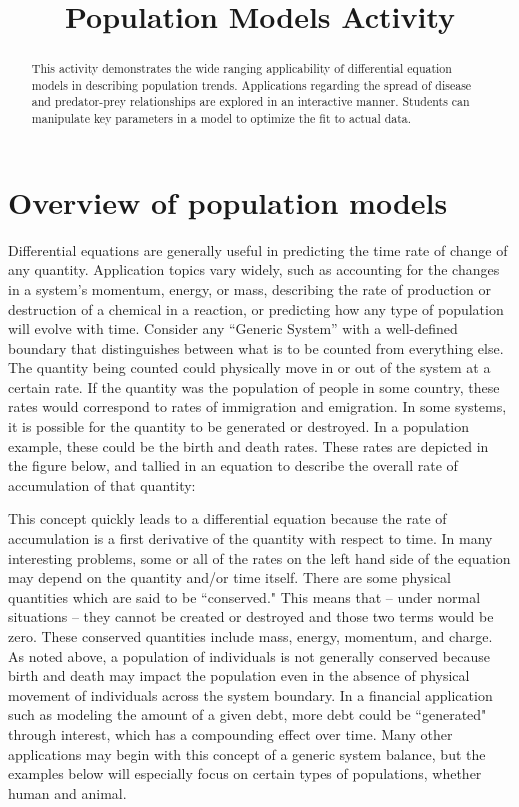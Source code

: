 \documentclass{ximera}
\title{Population Models Activity}
\begin{document}
   
\begin{abstract}
This activity demonstrates the wide ranging applicability of differential equation models in describing population trends.  Applications regarding the spread of disease and predator-prey relationships are explored in an interactive manner.  Students can manipulate key parameters in a model to optimize the fit to actual data.    
\end{abstract}
   
\maketitle
   
\section*{Overview of population models}
Differential equations are generally useful in predicting the time rate of change of any quantity.  Application topics vary widely, such as accounting for the changes in a system’s momentum, energy, or mass, describing the rate of production or destruction of a chemical in a reaction, or predicting how any type of population will evolve with time.  Consider any “Generic System” with a well-defined boundary that distinguishes between what is to be counted from everything else.  The quantity being counted could physically move in or out of the system at a certain rate.  If the quantity was the population of people in some country, these rates would correspond to rates of immigration and emigration.  In some systems, it is possible for the quantity to be generated or destroyed.  In a population example, these could be the birth and death rates.  These rates are depicted in the figure below, and tallied in an equation to describe the overall rate of accumulation of that quantity: 
 

This concept quickly leads to a differential equation because the rate of accumulation is a first derivative of the quantity with respect to time.  In many interesting problems, some or all of the rates on the left hand side of the equation may depend on the quantity and/or time itself.  There are some physical quantities which are said to be ``conserved."  This means that -- under normal situations – they cannot be created or destroyed and those two terms would be zero.  These conserved quantities include mass, energy, momentum, and charge.  As noted above, a population of individuals is not generally conserved because birth and death may impact the population even in the absence of physical movement of individuals across the system boundary.  In a financial application such as modeling the amount of a given debt, more debt could be ``generated" through interest, which has a compounding effect over time.  Many other applications may begin with this concept of a generic system balance, but the examples below will especially focus on certain types of populations, whether human and animal.
 
\end{document}
